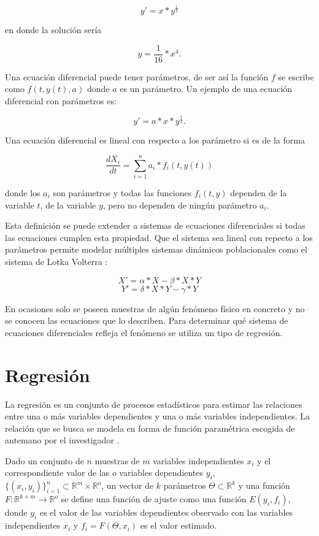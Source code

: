 $$y' = x * y^{\frac{1}{2}}$$

en donde la solución sería

$$y = \frac{1}{16} * x^4.$$

Una ecuación diferencial puede tener parámetros, de ser así la función $f$ se escribe como $f(t, y(t), a)$ donde $a$ es un parámetro. Un ejemplo de una ecuación diferencial con parámetros es:

$$y' = a * x * y^{\frac{1}{2}}.$$


Una ecuación diferencial es lineal con respecto a los parámetro si es de la forma

$$\frac{dX_i}{dt} = \sum_{i=1}^{n} a_i * f_i(t, y(t))$$

donde los $a_i$ son parámetros y todas las funciones $f_i(t,y)$ dependen de la variable $t$, de la variable $y$, pero no dependen de ningún parámetro $a_i$.

Esta definición se puede extender a sistemas de ecuaciones diferenciales si todas las ecuaciones cumplen esta propiedad. Que el sistema sea lineal con repecto a los parámetros permite modelar múltiples sistemas dinámicos poblacionales como el sistema de Lotka Volterra \cite{Hoppensteadt:2006}:

$$X' = \alpha * X - \beta * X * Y$$
$$Y' = \delta * X * Y - \gamma * Y$$

En ocasiones solo se poseen muestras de algún fenómeno físico en concreto y no se conocen las ecuaciones que lo describen. Para determinar qué sistema de ecuaciones diferenciales refleja el fenómeno se utiliza un tipo de regresión.

\section{Regresión}\label{section:regression}

La regresión es un conjunto de procesos estadísticos para estimar las relaciones entre una o más variables dependientes y una o más variables independientes. La relación que se busca se modela en forma de función paramétrica escogida de antemano por el investigador \cite{johnson2015applied}.

Dado un conjunto de $n$ muestras de $m$ variables independientes $x_i$ y el correspondiente valor de las $o$ variables dependientes $y_i$, $\{(x_i, y_i)\}^n_{i=1} \subset \mathbb{R}^m \times \mathbb{R}^o$, un vector de $k$ parámetros $\Theta \subset \mathbb{R}^k$ y una función $F : \mathbb{R}^{k + m} \rightarrow \mathbb{R}^o$ se define una función de ajuste como una función $E(y_i, f_i)$, donde $y_i$ es el valor de las variables dependientes observado con las variables independientes $x_i$ y $f_i = F(\Theta, x_i)$ es el valor estimado.

